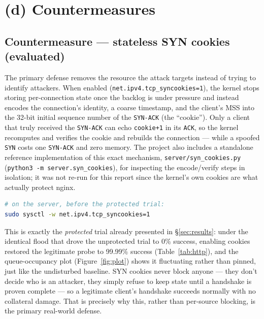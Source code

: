 \documentclass[11pt,a4paper]{article}
\begin{document}
\section{(d) Countermeasures}
\label{sec:def}

\subsection{Countermeasure --- stateless SYN cookies (evaluated)}
The primary defense removes the resource the attack targets instead of
trying to identify attackers. When enabled (\texttt{net.ipv4.tcp\_syncookies=1}),
the kernel stops storing per-connection state once the backlog is under
pressure and instead encodes the connection's identity, a coarse timestamp,
and the client's MSS into the 32-bit initial sequence number of the
\texttt{SYN-ACK} (the ``cookie''). Only a client that truly received the
\texttt{SYN-ACK} can echo \texttt{cookie+1} in its \texttt{ACK}, so the kernel
recomputes and verifies the cookie and rebuilds the connection --- while a
spoofed \texttt{SYN} costs one \texttt{SYN-ACK} and zero memory. The project
also includes a standalone reference implementation of this exact mechanism,
\texttt{server/syn\_cookies.py} (\texttt{python3 -m server.syn\_cookies}), for
inspecting the encode/verify steps in isolation; it was not re-run for this
report since the kernel's own cookies are what actually protect nginx.

\begin{lstlisting}[language=bash]
# on the server, before the protected trial:
sudo sysctl -w net.ipv4.tcp_syncookies=1
\end{lstlisting}

This is exactly the \emph{protected} trial already presented in
\S\ref{sec:results}: under the identical flood that drove the unprotected
trial to 0\% success, enabling cookies restored the legitimate probe to
99.99\% success (Table~\ref{tab:http}), and the queue-occupancy plot
(Figure~\ref{fig:plot}) shows it fluctuating rather than pinned, just like
the undisturbed baseline. SYN cookies never block anyone --- they don't
decide who is an attacker, they simply refuse to keep state until a
handshake is proven complete --- so a legitimate client's handshake succeeds
normally with no collateral damage. That is precisely why this, rather than
per-source blocking, is the primary real-world defense.
\end{document}
